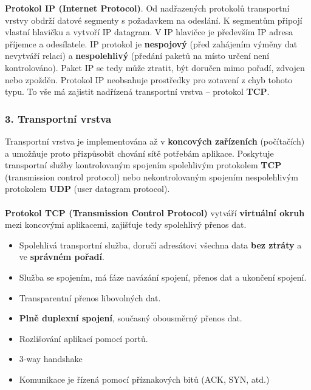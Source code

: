 \textbf{Protokol IP (Internet Protocol)}. Od nadřazených protokolů transportní vrstvy obdrží datové segmenty s požadavkem na odeslání. K segmentům připojí vlastní hlavičku a vytvoří IP datagram. V IP hlavičce je především IP adresa příjemce a odesílatele. IP protokol je \textbf{nespojový} (před zahájením výměny dat nevytváří relaci) a \textbf{nespolehlivý} (předání paketů na místo určení není kontrolováno). Paket IP se tedy může ztratit, být doručen mimo pořadí, zdvojen nebo zpožděn. Protokol IP neobsahuje prostředky pro zotavení z chyb tohoto typu. To vše má zajistit nadřízená transportní vrstva – protokol \textbf{TCP}.

\subsubsection*{3. Transportní vrstva}
Transportní vrstva je implementována až v \textbf{koncových zařízeních} (počítačích) a umožňuje proto přizpůsobit chování sítě potřebám aplikace. Poskytuje transportní služby kontrolovaným spojením spolehlivým protokolem \textbf{TCP} (transmission control protocol) nebo nekontrolovaným spojením nespolehlivým protokolem \textbf{UDP} (user datagram protocol).
\\\\
\textbf{Protokol TCP (Transmission Control Protocol)} vytváří \textbf{virtuální okruh} mezi koncovými aplikacemi, zajišťuje tedy spolehlivý přenos dat.
\begin{itemize}
	\item Spolehlivá transportní služba, doručí adresátovi všechna data \textbf{bez ztráty} a ve \textbf{správném pořadí}.
	\item Služba se spojením, má fáze navázání spojení, přenos dat a ukončení spojení.
	\item Transparentní přenos libovolných dat.
	\item \textbf{Plně duplexní spojení}, současný obousměrný přenos dat.
	\item Rozlišování aplikací pomocí portů.
	\item 3-way handshake
	\item Komunikace je řízená pomocí příznakových bitů (ACK, SYN, atd.)
\end{itemize}
\noindent{}

